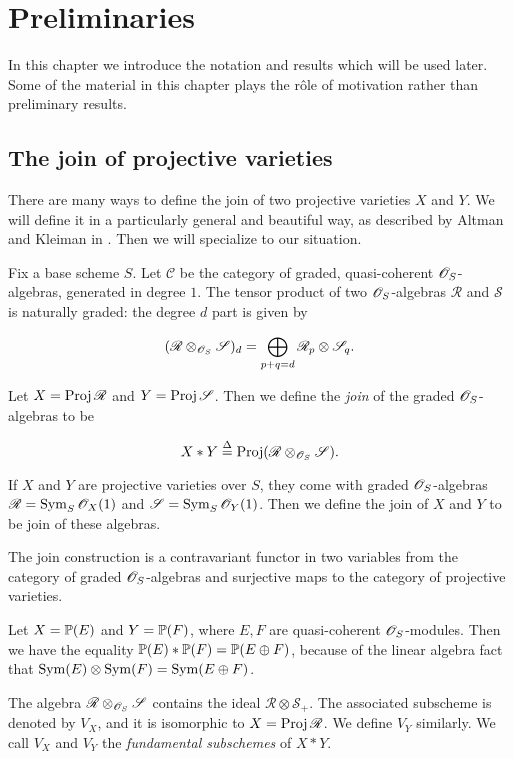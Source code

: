 \chapter{Preliminaries}
\label{sec:prelims}

In this chapter we introduce the notation and results which will be used later. Some of the material in this chapter plays the rôle of motivation rather than preliminary results.

\section{The join of projective varieties}

There are many ways to define the join of two projective varieties $X$ and $Y$. We will define it in a particularly general and beautiful  way, as described by Altman and Kleiman in \cite{altman_joins}. Then we will specialize to our situation.

Fix a base scheme $S$. Let $\mathscr C$ be the category of graded, quasi-coherent $\OO_S$-algebras, generated in degree $1$. The tensor product of two $\OO_S$-algebras $\mathscr R$ and $\mathscr S$  is naturally graded: the degree $d$ part is given by

\[
(\mathscr R \otimes_{\OO_S} \mathscr S)_d = \bigoplus_{p+q=d} \mathscr R_p \otimes \mathscr S_q.
\]

Let $X=\Proj \mathscr R$ and $Y = \Proj \mathscr S$. Then we define the \emph{join} of the graded $\OO_S$-algebras to be

\[
X \ast Y \stackrel \Delta =  \Proj (\mathscr R \otimes_{\OO_S} \mathscr S).
\]

If $X$ and $Y$ are projective varieties over $S$, they come with graded $\OO_S$-algebras $\mathscr R = \Sym_S \OO_X(1)$ and $\mathscr S = \Sym_S \OO_Y(1)$. Then we define the join of $X$ and $Y$ to be join of these algebras.

The join construction is a contravariant functor in two variables from the category of graded $\OO_S$-algebras and surjective maps to the category of projective varieties.

\begin{example}
Let $X=\P(E)$ and $Y=\P(F)$, where $E,F$ are quasi-coherent $\OO_S$-modules. Then we have the equality $\P(E) \ast \P(F) = \P(E \oplus F)$, because of the linear algebra fact that $\Sym(E) \otimes \Sym(F) = \Sym(E \oplus F)$.
\end{example}

The algebra $\mathscr R \otimes_{\OO_S} \mathscr S$ contains the ideal $\mathscr R \otimes \mathscr S_+$. The associated subscheme is denoted by $V_X$, and it is isomorphic to $X = \Proj \mathscr R$. We define $V_Y$ similarly. We call $V_X$ and $V_Y$ the \emph{fundamental subschemes} of $X \ast Y$.

